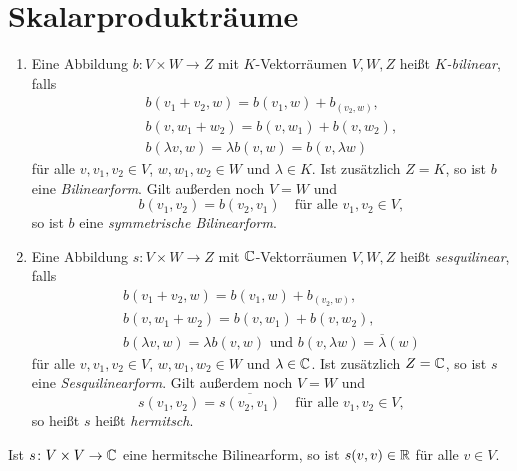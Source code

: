 \section{Skalarprodukträume}


\begin{definition}
  \begin{enumerate}[leftmargin=*, label=\roman*)]
    \item
      Eine Abbildung $b \colon V \times W \to Z$ mit $K$-Vektorräumen $V, W, Z$ heißt \emph{$K$-bilinear}, falls
      \begin{gather*}
        b(v_1 + v_2, w) = b(v_1, w) + b_(v_2, w), \\
        b(v, w_1 + w_2) = b(v, w_1) + b(v, w_2),  \\
        b(\lambda v, w) = \lambda b(v,w) = b(v, \lambda w)
      \end{gather*}
      für alle $v, v_1, v_2 \in V$, $w, w_1, w_2 \in W$ und $\lambda \in K$.
      Ist zusätzlich $Z = K$, so ist $b$ eine \emph{Bilinearform}.
      Gilt außerden noch $V = W$ und
      \[
        b(v_1, v_2) = b(v_2, v_1)
        \quad
        \text{für alle $v_1, v_2 \in V$},
      \]
      so ist $b$ eine \emph{symmetrische Bilinearform}.
    \item
      Eine Abbildung $s \colon V \times W \to Z$ mit $\mathbb{C}$-Vektorräumen $V, W, Z$ heißt \emph{sesquilinear}, falls
      \begin{gather*}
        b(v_1 + v_2, w) = b(v_1, w) + b_(v_2, w), \\
        b(v, w_1 + w_2) = b(v, w_1) + b(v, w_2),  \\
        b(\lambda v, w) = \lambda b(v,w)
        \text{ und }
        b(v, \lambda w) = \overline{\lambda}(w)
      \end{gather*}
      für alle $v, v_1, v_2 \in V$, $w, w_1, w_2 \in W$ und $\lambda \in \mathbb{C}$.
      Ist zusätzlich $Z = \mathbb{C}$, so ist $s$ eine \emph{Sesquilinearform}.
      Gilt außerdem noch $V = W$ und
      \[
        s(v_1, v_2) = \overline{s(v_2, v_1)}
        \quad
        \text{für alle $v_1, v_2 \in V$},
      \]
      so heißt $s$ heißt \emph{hermitsch}.
  \end{enumerate}
\end{definition}


\begin{lemma}
  Ist $s \colon V \times V \to \mathbb{C}$ eine hermitsche Bilinearform, so ist $s(v,v) \in \mathbb{R}$ für alle $v \in V$.
\end{lemma}


